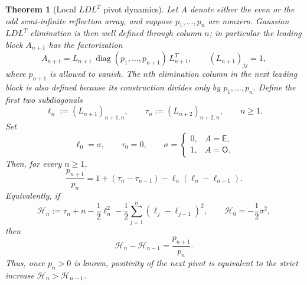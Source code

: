 \documentclass[11pt]{amsart}
\numberwithin{equation}{section}
\theoremstyle{plain}
\newtheorem{theorem}{Theorem}[section]
\theoremstyle{definition}
\theoremstyle{remark}
\newcommand{\E}{\mathsf E}
\newcommand{\Omat}{\mathsf O}
\newcommand{\diag}{\operatorname{diag}}
\begin{document}
\begin{theorem}[Local $LDL^T$ pivot dynamics]
\label{thm:local_ldl_pivot_ratio}
Let $A$ denote either the even or the odd semi-infinite reflection array, and suppose
$p_1,\dots,p_n$ are nonzero.  Gaussian $LDL^T$ elimination is then well defined through
column $n$; in particular the leading block $A_{n+1}$ has the factorization
\begin{equation}
 A_{n+1}=L_{n+1}\,\diag(p_1,\dots,p_{n+1})\,L_{n+1}^T,
 \qquad (L_{n+1})_{jj}=1,
 \label{eq:local_LDL_factor}
\end{equation}
where $p_{n+1}$ is allowed to vanish.  The $n$th elimination column in the next
leading block is also defined because its construction divides only by
$p_1,\dots,p_n$.  Define the first two subdiagonals
\begin{equation}
 \ell_n:=(L_{n+1})_{n+1,n},
 \qquad
 \tau_n:=(L_{n+2})_{n+2,n},
 \qquad n\ge1.
 \label{eq:ell_tau_def}
\end{equation}
Set
\begin{equation}
 \ell_0=\sigma,
 \qquad \tau_0=0,
 \qquad
 \sigma=\begin{cases}0,&A=\E,\\1,&A=\Omat.\end{cases}
 \label{eq:ell_tau_boundary}
\end{equation}
Then, for every $n\ge1$,
\begin{equation}
 \boxed{\;
 \frac{p_{n+1}}{p_n}
 =1+(\tau_n-\tau_{n-1})
 -\ell_n(\ell_n-\ell_{n-1}).\;}
 \label{eq:local_pivot_ratio}
\end{equation}
Equivalently, if
\begin{equation}
 \mathcal H_n:=\tau_n+n-\frac12\ell_n^2
 -\frac12\sum_{j=1}^{n}(\ell_j-\ell_{j-1})^2,
 \qquad \mathcal H_0=-\frac12\sigma^2,
 \label{eq:Hlocal_def}
\end{equation}
then
\begin{equation}
 \boxed{\;\mathcal H_n-\mathcal H_{n-1}=\frac{p_{n+1}}{p_n}.\;}
 \label{eq:Hlocal_increment}
\end{equation}
Thus, once $p_n>0$ is known, positivity of the next pivot is equivalent to the strict
increase $\mathcal H_n>\mathcal H_{n-1}$.
\end{theorem}
\end{document}
